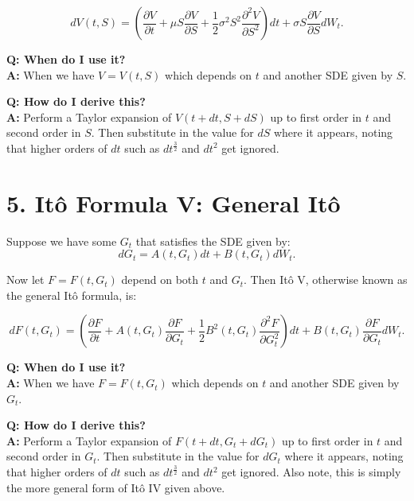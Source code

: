 \documentclass[11pt]{article}
\begin{document}
\begin{equation}
    dV(t,S) = \left( \frac{\partial V}{\partial t} + \mu S \frac{\partial V}{\partial S} + \frac{1}{2} \sigma^2 S^2 \frac{\partial^{2} V}{\partial S^{2}}\right) dt + \sigma S \frac{\partial V}{\partial S} dW_t.    
\end{equation}

\textbf{Q: When do I use it?} \\
\textbf{A:} When we have $V = V(t, S)$ which depends on $t$ and another SDE given by $S$.

\textbf{Q: How do I derive this?} \\
\textbf{A:} Perform a Taylor expansion of $V(t+dt, S+dS)$ up to first order in $t$ and second order in $S$. Then substitute in the value for $dS$ where it appears, noting that higher orders of $dt$ such as $dt^{\frac{3}{2}}$ and $dt^2$ get ignored.   

\vspace{1cm}


\section*{5. Itô Formula V: General Itô}
Suppose we have some $G_t$ that satisfies the SDE given by:
\begin{equation*}
    dG_t = A(t, G_t) dt + B(t, G_t) dW_t.
\end{equation*}

Now let $F = F(t, G_t)$ depend on both $t$ and $G_t$. Then Itô V, otherwise known as the general Itô formula, is:

\begin{equation}
    dF(t,G_t) = \left( \frac{\partial F}{\partial t} + A(t,G_t) \frac{\partial F}{\partial G_t} + \frac{1}{2} B^2(t,G_t) \frac{\partial^{2} F}{\partial G_t^{2}}\right) dt + B(t,G_t) \frac{\partial F}{\partial G_t} dW_t.    
\end{equation}

\textbf{Q: When do I use it?} \\
\textbf{A:} When we have $F = F(t, G_t)$ which depends on $t$ and another SDE given by $G_t$.

\textbf{Q: How do I derive this?} \\
\textbf{A:} Perform a Taylor expansion of $F(t+dt, G_t+dG_t)$ up to first order in $t$ and second order in $G_t$. Then substitute in the value for $dG_t$ where it appears, noting that higher orders of $dt$ such as $dt^{\frac{3}{2}}$ and $dt^2$ get ignored. Also note, this is simply the more general form of Itô IV given above. 
\end{document}
